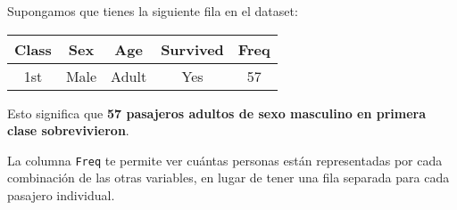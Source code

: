 \documentclass{article}
\begin{document}
\begin{enumerate}
    Supongamos que tienes la siguiente fila en el dataset:
    
    \begin{center}
    \begin{tabular}{|c|c|c|c|c|}
    \hline
    \textbf{Class} & \textbf{Sex} & \textbf{Age} & \textbf{Survived} & \textbf{Freq} \\
    \hline
    1st & Male & Adult & Yes & 57 \\
    \hline
    \end{tabular}
    \end{center}
    
    Esto significa que \textbf{57 pasajeros adultos de sexo masculino en primera clase sobrevivieron}.
    
    La columna \texttt{Freq} te permite ver cuántas personas están representadas por cada combinación de las otras variables, en lugar de tener una fila separada para cada pasajero individual.
    

\end{enumerate}
\end{document}
